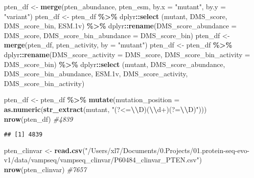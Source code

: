\documentclass[
]{article}
\newenvironment{Shaded}{\begin{snugshade}}{\end{snugshade}}
\newcommand{\AttributeTok}[1]{\textcolor[rgb]{0.13,0.29,0.53}{#1}}
\newcommand{\CommentTok}[1]{\textcolor[rgb]{0.56,0.35,0.01}{\textit{#1}}}
\newcommand{\FloatTok}[1]{\textcolor[rgb]{0.00,0.00,0.81}{#1}}
\newcommand{\FunctionTok}[1]{\textcolor[rgb]{0.13,0.29,0.53}{\textbf{#1}}}
\newcommand{\NormalTok}[1]{#1}
\newcommand{\OtherTok}[1]{\textcolor[rgb]{0.56,0.35,0.01}{#1}}
\newcommand{\SpecialCharTok}[1]{\textcolor[rgb]{0.81,0.36,0.00}{\textbf{#1}}}
\newcommand{\StringTok}[1]{\textcolor[rgb]{0.31,0.60,0.02}{#1}}
\begin{document}
\begin{Shaded}
\begin{Highlighting}[]
\NormalTok{pten\_df }\OtherTok{\textless{}{-}} \FunctionTok{merge}\NormalTok{(pten\_abundance, pten\_esm, }\AttributeTok{by.x =} \StringTok{"mutant"}\NormalTok{, }\AttributeTok{by.y =} \StringTok{"variant"}\NormalTok{) }
\NormalTok{pten\_df }\OtherTok{\textless{}{-}}\NormalTok{ pten\_df }\SpecialCharTok{\%\textgreater{}\%}\NormalTok{ dplyr}\SpecialCharTok{::}\FunctionTok{select}\NormalTok{ (mutant, DMS\_score, DMS\_score\_bin, ESM}\FloatTok{.1}\NormalTok{v) }\SpecialCharTok{\%\textgreater{}\%} 
\NormalTok{  dplyr}\SpecialCharTok{::}\FunctionTok{rename}\NormalTok{(}\AttributeTok{DMS\_score\_abundance =}\NormalTok{ DMS\_score,}
                \AttributeTok{DMS\_score\_bin\_abundance =}\NormalTok{ DMS\_score\_bin)}
\NormalTok{pten\_df }\OtherTok{\textless{}{-}} \FunctionTok{merge}\NormalTok{(pten\_df, pten\_activity, }\AttributeTok{by =} \StringTok{"mutant"}\NormalTok{) }
\NormalTok{pten\_df }\OtherTok{\textless{}{-}}\NormalTok{ pten\_df }\SpecialCharTok{\%\textgreater{}\%}\NormalTok{ dplyr}\SpecialCharTok{::}\FunctionTok{rename}\NormalTok{(}\AttributeTok{DMS\_score\_activity =}\NormalTok{ DMS\_score,}
                                     \AttributeTok{DMS\_score\_bin\_activity =}\NormalTok{ DMS\_score\_bin) }\SpecialCharTok{\%\textgreater{}\%} 
\NormalTok{  dplyr}\SpecialCharTok{::}\FunctionTok{select}\NormalTok{ (mutant, DMS\_score\_abundance, DMS\_score\_bin\_abundance, ESM}\FloatTok{.1}\NormalTok{v,}
\NormalTok{                 DMS\_score\_activity, DMS\_score\_bin\_activity)}


\NormalTok{pten\_df }\OtherTok{\textless{}{-}}\NormalTok{ pten\_df }\SpecialCharTok{\%\textgreater{}\%}
  \FunctionTok{mutate}\NormalTok{(}\AttributeTok{mutation\_position =} \FunctionTok{as.numeric}\NormalTok{(}\FunctionTok{str\_extract}\NormalTok{(mutant, }\StringTok{"(?\textless{}=}\SpecialCharTok{\textbackslash{}\textbackslash{}}\StringTok{D)(}\SpecialCharTok{\textbackslash{}\textbackslash{}}\StringTok{d+)(?=}\SpecialCharTok{\textbackslash{}\textbackslash{}}\StringTok{D)"}\NormalTok{)))}
\FunctionTok{nrow}\NormalTok{(pten\_df) }\CommentTok{\#4839}
\end{Highlighting}
\end{Shaded}

\begin{verbatim}
## [1] 4839
\end{verbatim}

\begin{Shaded}
\begin{Highlighting}[]
\NormalTok{pten\_clinvar }\OtherTok{\textless{}{-}} \FunctionTok{read.csv}\NormalTok{(}\StringTok{"/Users/xl7/Documents/0.Projects/01.protein{-}seq{-}evo{-}v1/data/vampseq/vampseq\_clinvar/P60484\_clinvar\_PTEN.csv"}\NormalTok{)}
\FunctionTok{nrow}\NormalTok{(pten\_clinvar) }\CommentTok{\#7657}
\end{Highlighting}
\end{Shaded}
\end{document}
